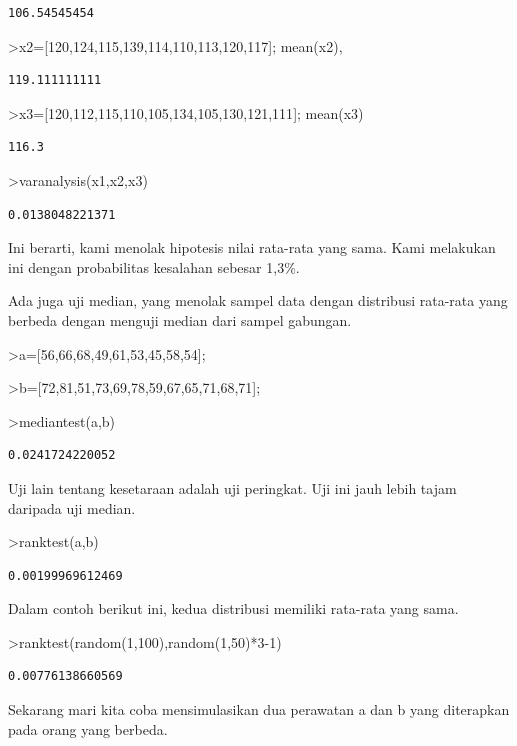 \documentclass[
]{book}
\begin{document}
\begin{verbatim}
106.54545454
\end{verbatim}

\textgreater x2={[}120,124,115,139,114,110,113,120,117{]}; mean(x2),

\begin{verbatim}
119.111111111
\end{verbatim}

\textgreater x3={[}120,112,115,110,105,134,105,130,121,111{]}; mean(x3)

\begin{verbatim}
116.3
\end{verbatim}

\textgreater varanalysis(x1,x2,x3)

\begin{verbatim}
0.0138048221371
\end{verbatim}

Ini berarti, kami menolak hipotesis nilai rata-rata yang sama. Kami melakukan ini dengan probabilitas kesalahan sebesar 1,3\%.

Ada juga uji median, yang menolak sampel data dengan distribusi rata-rata yang berbeda dengan menguji median dari sampel gabungan.

\textgreater a={[}56,66,68,49,61,53,45,58,54{]};

\textgreater b={[}72,81,51,73,69,78,59,67,65,71,68,71{]};

\textgreater mediantest(a,b)

\begin{verbatim}
0.0241724220052
\end{verbatim}

Uji lain tentang kesetaraan adalah uji peringkat. Uji ini jauh lebih tajam daripada uji median.

\textgreater ranktest(a,b)

\begin{verbatim}
0.00199969612469
\end{verbatim}

Dalam contoh berikut ini, kedua distribusi memiliki rata-rata yang sama.

\textgreater ranktest(random(1,100),random(1,50)*3-1)

\begin{verbatim}
0.00776138660569
\end{verbatim}

Sekarang mari kita coba mensimulasikan dua perawatan a dan b yang diterapkan pada orang yang berbeda.
\end{document}
